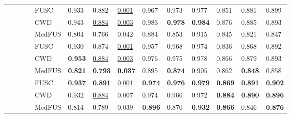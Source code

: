 \documentclass[review]{elsarticle}
\begin{document}
\begin{table*}[!h]
{\begin{tabular}{|l|l|l|l|l|l|l|l|l|l|l|l|l|l|}
			\checkmark&&\checkmark&\checkmark& FUSC & 0.933    &0.882      &\underline{0.001}& 0.967 &0.973   &0.977  & 0.851&0.881 &0.899 \\ \cline{5-14} 
	    	&&&	& CWD  & 0.943    & \underline{0.884}     &\underline{0.003}& 0.983 &\textbf{0.978}   & \textbf{0.984} & 0.876&0.885 &0.893 \\ \cline{5-14}
			&&&& MedFUS  &0.804    &0.766 &0.042&0.884 &0.853   &0.915  &0.845 &0.821 &0.847 \\ \hline
			
			\checkmark&\checkmark&\checkmark& & FUSC & 0.930    &0.874      &\underline{0.001}& 0.957 &0.968   &0.974  & 0.836&0.868 &0.892 \\ \cline{5-14} 
			&&&& CWD  & \textbf{0.953}    &\underline{0.884} &\underline{0.003}& 0.976 &0.975   &0.978  & 0.866&0.879 &0.893 \\ \cline{5-14}
			&&&& MedFUS  &\textbf{0.821}    &\textbf{0.793} &\textbf{0.037}&0.895 &\textbf{0.874 }  &0.905  &0.862 &\textbf{0.848} &0.858 \\ \hline
			
			\checkmark&\checkmark&\checkmark&\checkmark & FUSC & \textbf{0.937 }   &\textbf{0.891}&\underline{0.001}&\textbf{ 0.974 }&\textbf{0.976 }  &\textbf{0.979}& \textbf{0.869}&\textbf{0.891} &\textbf{0.902} \\ \cline{5-14} 
			&&&& CWD  & 0.932    &\underline{0.884} &0.007& 0.974 &0.966   &0.972  & \textbf{0.884}&\textbf{0.890} &\textbf{0.896} \\ \cline{5-14}
			&&&& MedFUS  &0.814&0.789 &0.039   &\textbf{0.896 } &0.870 &\textbf{0.932}  &\textbf{0.866}  &0.846 &\textbf{0.876}\\ \hline
	\end{tabular}}
\end{table*}
\end{document}
